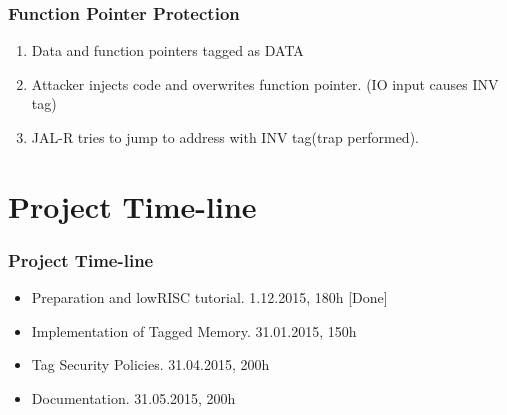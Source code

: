 \documentclass{beamer}
\begin{document}
\begin{frame}
	\frametitle{Function Pointer Protection}
	\begin{enumerate}
	\item Data and function pointers tagged as DATA
	\item Attacker injects code and overwrites function pointer. (IO input causes INV tag)
	\item JAL-R tries to jump to address with INV tag(trap performed).
	\end{enumerate}
	\begin{figure}[!h]
		\begin{center}
	\end{center}
	\end{figure}
\end{frame}

\section{Project Time-line}

\begin{frame}
	\frametitle{Project Time-line}
   \begin{itemize}
   	  \item Preparation and lowRISC tutorial. 1.12.2015, 180h [Done]
	   \item Implementation of Tagged Memory. 31.01.2015, 150h
	   \item Tag Security Policies. 31.04.2015, 200h
		\item Documentation. 31.05.2015, 200h
   \end{itemize}
\end{frame}




\end{document}

